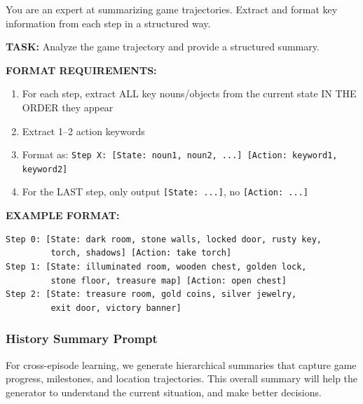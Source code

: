 \begin{promptbox}[title=Jericho State Summarization Prompt]
\small
You are an expert at summarizing game trajectories. Extract and format key information from each step in a structured way.

\textbf{TASK:} Analyze the game trajectory and provide a structured summary.

\textbf{FORMAT REQUIREMENTS:}
\begin{enumerate}[leftmargin=*,nosep]
    \item For each step, extract ALL key nouns/objects from the current state IN THE ORDER they appear
    \item Extract 1--2 action keywords
    \item Format as: \texttt{Step X: [State: noun1, noun2, ...] [Action: keyword1, keyword2]}
    \item For the LAST step, only output \texttt{[State: ...]}, no \texttt{[Action: ...]}
\end{enumerate}

\textbf{EXAMPLE FORMAT:}
\begin{verbatim}
Step 0: [State: dark room, stone walls, locked door, rusty key,
         torch, shadows] [Action: take torch]
Step 1: [State: illuminated room, wooden chest, golden lock,
         stone floor, treasure map] [Action: open chest]
Step 2: [State: treasure room, gold coins, silver jewelry,
         exit door, victory banner]
\end{verbatim}
\end{promptbox}

\subsubsection{History Summary Prompt}

For cross-episode learning, we generate hierarchical summaries that capture game progress, milestones, and location trajectories. This overall summary will help the generator to understand the current situation, and make better decisions.

